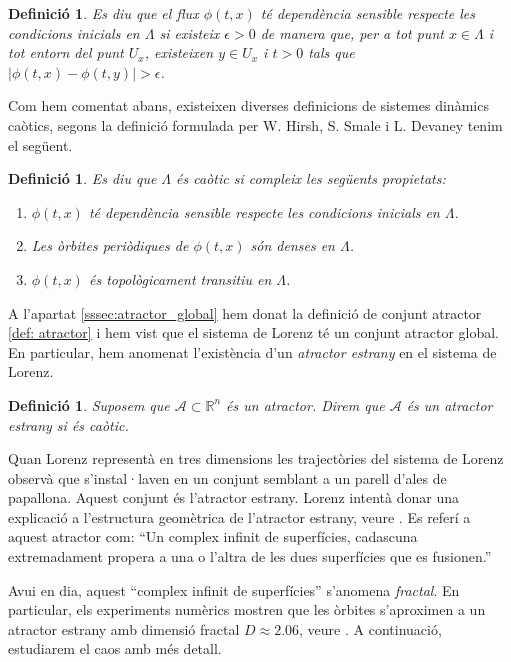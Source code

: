 \documentclass[11pt,a4paper,openright,oneside]{article}
\numberwithin{equation}{section}
\newtheorem{defi}[teo]{Definici\'o}
\theoremstyle{definition}
\begin{document}
\begin{defi}
    Es diu que el flux $\phi(t,x)$ té \textit{dependència sensible respecte les condicions inicials} en $\Lambda$ si existeix $\epsilon>0$ de manera que, per a tot punt $x\in \Lambda$ i tot entorn del punt $U_x$, existeixen $y\in U_x$ i $t>0$ tals que $|\phi(t,x)-\phi(t,y)|>\epsilon$.
\end{defi}

Com hem comentat abans, existeixen diverses definicions de sistemes dinàmics caòtics, segons la definició formulada per W. Hirsh, S. Smale i L. Devaney \cite{Smale} tenim el següent.

\begin{defi}
    Es diu que $\Lambda$ és caòtic si compleix les següents propietats:

    \begin{enumerate}
        \item $\phi(t,x)$ té dependència sensible respecte les condicions inicials en $\Lambda$.

        \item Les òrbites periòdiques de $\phi(t,x)$ són denses en $\Lambda$.

        \item $\phi(t,x)$ és topològicament transitiu en $\Lambda$.
    \end{enumerate}
\end{defi}

A l'apartat \ref{sssec:atractor_global} hem donat la definició de conjunt atractor \eqref{def: atractor} i hem vist que el sistema de Lorenz té un conjunt atractor global. En particular, hem anomenat l'existència d'un \textit{atractor estrany} en el sistema de Lorenz. 

\begin{defi}
    Suposem que $\mathscr{A}\subset \mathbb{R}^n$ és un atractor. Direm que $\mathscr{A}$ és un \textit{atractor estrany} si és caòtic. 
\end{defi}

Quan Lorenz representà en tres dimensions les trajectòries del sistema de Lorenz observà que s'instal·laven en un conjunt semblant a un parell d'ales de papallona. Aquest conjunt és l'atractor estrany. Lorenz intentà donar una explicació a l'estructura geomètrica de l'atractor estrany, veure \cite{Lorenz}. Es referí a aquest atractor com: ``Un complex infinit de superfícies, cadascuna extremadament propera a una o l'altra de les dues superfícies que es fusionen.''

Avui en dia, aquest ``complex infinit de superfícies'' s'anomena \textit{fractal}. En particular, els experiments numèrics mostren que les òrbites s'aproximen a un atractor estrany amb dimensió fractal $D\approx2.06$, veure \cite{Fractal}. A continuació, estudiarem el caos amb més detall.
\end{document}
